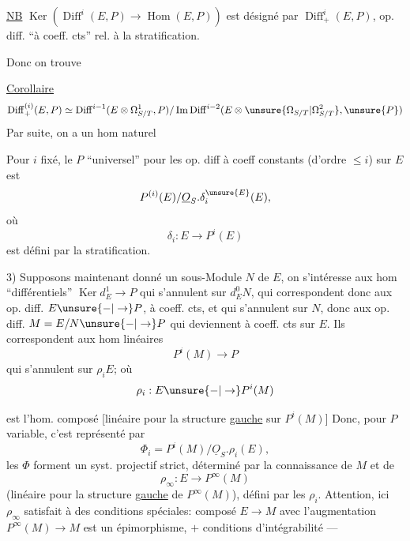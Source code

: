\uline{NB} $\operatorname{Ker}(\operatorname{Diff}^i(E,P)\to\operatorname{Hom}(E,P))$ est désigné par
$\operatorname{Diff}^i_+(E,P)$, op. diff. ``à coeff. cts'' rel. à la stratification.

Donc on trouve

\uline{Corollaire}
\[
\operatorname{Diff}^{(i)}_+(E,P)\simeq
\operatorname{Diff}^{i-1}(E\otimes\Omega^1_{S/T},P)/\operatorname{Im}\operatorname{Diff}^{i-2}(E\otimes\unsure{\Omega_{S/T}|\Omega^2_{S/T}},\unsure{P})
\]
Par suite, on a un hom naturel 

Pour $i$ fixé, le $P$ ``universel'' pour les op. diff à coeff constants (d'ordre $\leq i$) sur $E$ est
\[
P^{(i)}(E)/\underline{O}_S.\delta_i^{\unsure{E}}(E),
\]
où
\[
\delta_i:E\longrightarrow P^i(E)
\]
est défini par la stratification.

3) Supposons maintenant donné un sous-Module $N$ de $E$, on s'intéresse aux hom ``différentiels'' $\operatorname{Ker}d_E^1\to P$ qui s'annulent sur $d_E^0N$, qui correspondent donc aux op. diff. $E\unsure{\mathbin{-}|\to}P$, à coeff. cts, et qui s'annulent sur $N$, donc aux op. diff. $M=E/N\unsure{\mathbin{-}|\to}P$ qui  deviennent à coeff. cts sur $E$. Ils correspondent  aux hom linéaires
\[
P^i(M)\longrightarrow P
\]
qui s'annulent sur $\rho_iE$; où
\[
\rho_i:E\unsure{\mathbin{-}|\to}P^i(M)
\]

est l'hom. composé [linéaire pour la structure \uline{gauche} sur $P^i(M)$]
Donc, pour $P$ variable, c'est représenté par
\[
\Phi_i=P^i(M)/\underline{O}_S.\rho_i(E),
\]
les $\Phi$ forment un syst. projectif strict, déterminé par la connaissance de $M$ et de
\[
\rho_\infty:E\longrightarrow P^\infty(M)
\]
(linéaire pour la structure \uline{gauche} de $P^\infty(M)$), défini par les $\rho_i$.
Attention, ici $\rho_\infty$ satisfait à des  conditions spéciales:  composé $E\to M$ avec l'augmentation $P^\infty(M)\to M$ est un épimorphisme, $+$ conditions d'intégrabilité ---

